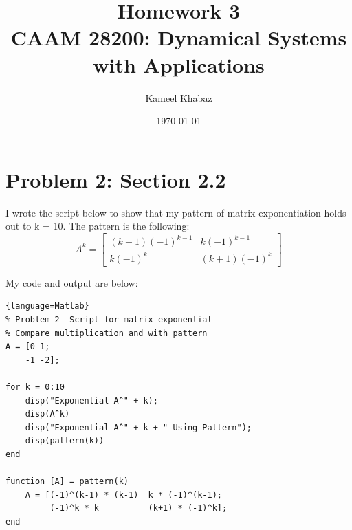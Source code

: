 \documentclass[11pt]{article}
\title{Homework 3 \large \\ CAAM 28200: Dynamical Systems with Applications}
\author{Kameel Khabaz}
\date{\today}
\begin{document}
\maketitle

\section*{Problem 2: Section 2.2}
I wrote the script below to show that my pattern of matrix exponentiation holds out to k = 10. The pattern is the following:
$$ A^k = \begin{bmatrix} (k-1)(-1)^{k-1} & k(-1)^{k-1} \\
	k(-1)^k  & (k+1)(-1)^k \end{bmatrix}$$

My code and output are below:
\begin{lstlisting}{language=Matlab}
% Problem 2  Script for matrix exponential
% Compare multiplication and with pattern
A = [0 1; 
    -1 -2];

for k = 0:10
    disp("Exponential A^" + k);
    disp(A^k)
    disp("Exponential A^" + k + " Using Pattern");
    disp(pattern(k))
end 

function [A] = pattern(k)
    A = [(-1)^(k-1) * (k-1)  k * (-1)^(k-1); 
         (-1)^k * k          (k+1) * (-1)^k];
end 
\end{lstlisting}
\end{document}
